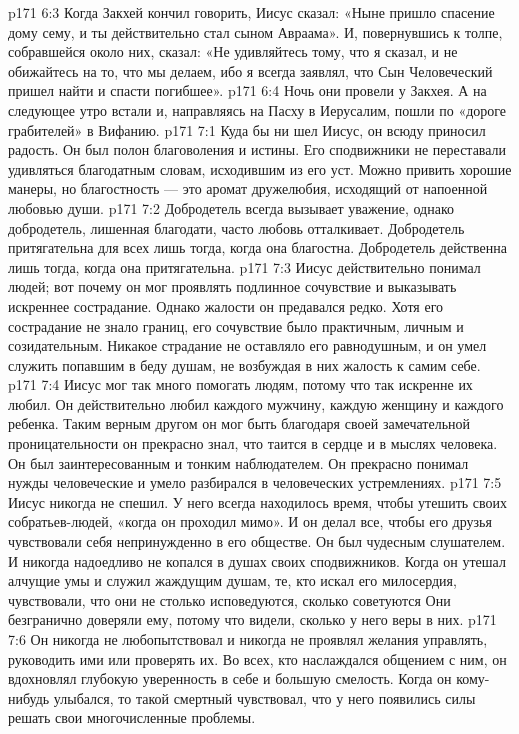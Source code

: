 \vs p171 6:3 Когда Закхей кончил говорить, Иисус сказал: «Ныне пришло спасение дому сему, и ты действительно стал сыном Авраама». И, повернувшись к толпе, собравшейся около них, сказал: «Не удивляйтесь тому, что я сказал, и не обижайтесь на то, что мы делаем, ибо я всегда заявлял, что Сын Человеческий пришел найти и спасти погибшее».
\vs p171 6:4 Ночь они провели у Закхея. А на следующее утро встали и, направляясь на Пасху в Иерусалим, пошли по «дороге грабителей» в Вифанию.
\vs p171 7:1 Куда бы ни шел Иисус, он всюду приносил радость. Он был полон благоволения и истины. Его сподвижники не переставали удивляться благодатным словам, исходившим из его уст. Можно привить хорошие манеры, но благостность --- это аромат дружелюбия, исходящий от напоенной любовью души.
\vs p171 7:2 Добродетель всегда вызывает уважение, однако добродетель, лишенная благодати, часто любовь отталкивает. Добродетель притягательна для всех лишь тогда, когда она благостна. Добродетель действенна лишь тогда, когда она притягательна.
\vs p171 7:3 Иисус действительно понимал людей; вот почему он мог проявлять подлинное сочувствие и выказывать искреннее сострадание. Однако жалости он предавался редко. Хотя его сострадание не знало границ, его сочувствие было практичным, личным и созидательным. Никакое страдание не оставляло его равнодушным, и он умел служить попавшим в беду душам, не возбуждая в них жалость к самим себе.
\vs p171 7:4 Иисус мог так много помогать людям, потому что так искренне их любил. Он действительно любил каждого мужчину, каждую женщину и каждого ребенка. Таким верным другом он мог быть благодаря своей замечательной проницательности он прекрасно знал, что таится в сердце и в мыслях человека. Он был заинтересованным и тонким наблюдателем. Он прекрасно понимал нужды человеческие и умело разбирался в человеческих устремлениях.
\vs p171 7:5 Иисус никогда не спешил. У него всегда находилось время, чтобы утешить своих собратьев\hyp{}людей, «когда он проходил мимо». И он делал все, чтобы его друзья чувствовали себя непринужденно в его обществе. Он был чудесным слушателем. И никогда надоедливо не копался в душах своих сподвижников. Когда он утешал алчущие умы и служил жаждущим душам, те, кто искал его милосердия, чувствовали, что они не столько  исповедуются, сколько советуются  Они безгранично доверяли ему, потому что видели, сколько у него веры в них.
\vs p171 7:6 Он никогда не любопытствовал и никогда не проявлял желания управлять, руководить ими или проверять их. Во всех, кто наслаждался общением с ним, он вдохновлял глубокую уверенность в себе и большую смелость. Когда он кому\hyp{}нибудь улыбался, то такой смертный чувствовал, что у него появились силы решать свои многочисленные проблемы.
